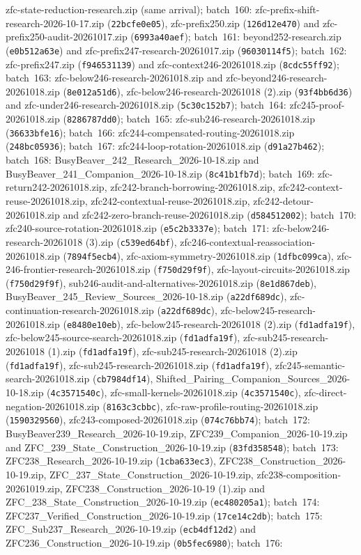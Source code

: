 \documentclass[11pt]{article}
\begin{document}
zfc-state-reduction-research.zip (same arrival); batch~160: zfc-prefix-shift-research-2026-10-17.zip (\texttt{22bcfe0e05}), zfc-prefix250.zip (\texttt{126d12e470}) and zfc-prefix250-audit-20261017.zip (\texttt{6993a40aef}); batch~161: beyond252-research.zip (\texttt{e0b512a63e}) and zfc-prefix247-research-20261017.zip (\texttt{96030114f5}); batch~162: zfc-prefix247.zip (\texttt{f946531139}) and zfc-context246-20261018.zip (\texttt{8cdc55ff92}); batch~163: zfc-below246-research-20261018.zip and zfc-beyond246-research-20261018.zip (\texttt{8e012a51d6}), zfc-below246-research-20261018 (2).zip (\texttt{93f4bb6d36}) and zfc-under246-research-20261018.zip (\texttt{5c30c152b7}); batch~164: zfc245-proof-20261018.zip (\texttt{8286787dd0}); batch~165: zfc-sub246-research-20261018.zip (\texttt{36633bfe16}); batch~166: zfc244-compensated-routing-20261018.zip (\texttt{248bc05936}); batch~167: zfc244-loop-rotation-20261018.zip (\texttt{d91a27b462}); batch~168: BusyBeaver\_242\_Research\_2026-10-18.zip and BusyBeaver\_241\_Companion\_2026-10-18.zip (\texttt{8c41b1fb7d}); batch~169: zfc-return242-20261018.zip, zfc242-branch-borrowing-20261018.zip, zfc242-context-reuse-20261018.zip, zfc242-contextual-reuse-20261018.zip, zfc242-detour-20261018.zip and zfc242-zero-branch-reuse-20261018.zip (\texttt{d584512002}); batch~170: zfc240-source-rotation-20261018.zip (\texttt{e5c2b3337e}); batch~171: zfc-below246-research-20261018 (3).zip (\texttt{c539ed64bf}), zfc246-contextual-reassociation-20261018.zip (\texttt{7894f5ecb4}), zfc-axiom-symmetry-20261018.zip (\texttt{1dfbc099ca}), zfc-246-frontier-research-20261018.zip (\texttt{f750d29f9f}), zfc-layout-circuits-20261018.zip (\texttt{f750d29f9f}), sub246-audit-and-alternatives-20261018.zip (\texttt{8e1d867deb}), BusyBeaver\_245\_Review\_Sources\_2026-10-18.zip (\texttt{a22df689dc}), zfc-continuation-research-20261018.zip (\texttt{a22df689dc}), zfc-below245-research-20261018.zip (\texttt{e8480e10eb}), zfc-below245-research-20261018 (2).zip (\texttt{fd1adfa19f}), zfc-below245-source-search-20261018.zip (\texttt{fd1adfa19f}), zfc-sub245-research-20261018 (1).zip (\texttt{fd1adfa19f}), zfc-sub245-research-20261018 (2).zip (\texttt{fd1adfa19f}), zfc-sub245-research-20261018.zip (\texttt{fd1adfa19f}), zfc245-semantic-search-20261018.zip (\texttt{cb7984df14}), Shifted\_Pairing\_Companion\_Sources\_2026-10-18.zip (\texttt{4c3571540c}), zfc-small-kernels-20261018.zip (\texttt{4c3571540c}), zfc-direct-negation-20261018.zip (\texttt{8163c3cbbc}), zfc-raw-profile-routing-20261018.zip (\texttt{1590329560}), zfc243-composed-20261018.zip (\texttt{074c76bb74}); batch~172: BusyBeaver239\_Research\_2026-10-19.zip, ZFC239\_Companion\_2026-10-19.zip and ZFC\_239\_State\_Construction\_2026-10-19.zip (\texttt{83fd358548}); batch~173: ZFC238\_Research\_2026-10-19.zip (\texttt{1cba633ec3}), ZFC238\_Construction\_2026-10-19.zip, ZFC\_237\_State\_Construction\_2026-10-19.zip, zfc238-composition-20261019.zip, ZFC238\_Construction\_2026-10-19 (1).zip and ZFC\_238\_State\_Construction\_2026-10-19.zip (\texttt{ec480205a1}); batch~174: ZFC237\_Verified\_Construction\_2026-10-19.zip (\texttt{17ce14c2db}); batch~175: ZFC\_Sub237\_Research\_2026-10-19.zip (\texttt{ecb4df12d2}) and ZFC236\_Construction\_2026-10-19.zip (\texttt{0b5fec6980}); batch~176: 
\end{document}
